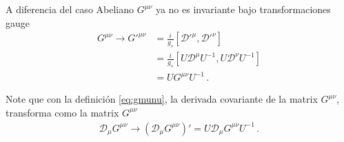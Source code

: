 A diferencia del caso Abeliano $G^{\mu\nu}$ ya no es invariante bajo transformaciones gauge
\begin{align}
G^{\mu\nu}\to    {G'}^{\mu\nu}
  &=\frac{i}{g_s}\left[{\mathcal{D}'}^\mu,{\mathcal{D}'}^\nu\right]\nonumber\\
&=\frac{i}{g_s}\left[U{\mathcal{D}}^\mu U^{-1},U{\mathcal{D}}^\nu U^{-1}\right]\nonumber\\
&=U{{G}}^{\mu\nu}U^{-1}\,.
\end{align}

Note que con la definición \eqref{eq:gmunu}, la derivada covariante de la matrix $G^{\mu\nu}$, transforma como la matrix $G^{\mu\nu}$
\begin{align}
\mathcal{D}_\mu G^{\mu\nu} \to\left(\mathcal{D}_\mu G^{\mu\nu}\right)'=U\mathcal{D}_\mu G^{\mu\nu} U^{-1}\,.
\end{align}





